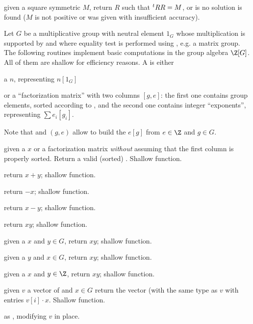  given a square symmetric  $M$, return
$R$ such that $^t{}R\*R = M$, or  is no solution is found ($M$ is
not positive or was given with insufficient accuracy).


Let $G$ be a multiplicative group with neutral element $1_G$ whose
multiplication is supported by  and where equality test is
performed using , e.g. a matrix group. The following
routines implement basic computations in the group algebra $\Z[G]$. All of
them are shallow for efficiency reasons. A  is either

\item a  $n$, representing $n[1_G]$

\item or a ``factorization matrix'' with two columns $[g,e]$: the first one
contains group elements, sorted according to , and the
second one contains integer ``exponents'', representing $\sum e_i [g_i]$.

Note that  and $(g,e)$ allow to build
the  $e[g]$ from $e\in \Z$ and $g\in G$.

 given a  $x$ or a factorization
matrix \emph{without} assuming that the first column is properly sorted.
Return a valid (sorted) . Shallow function.

 return $x+y$; shallow function.

 return $-x$; shallow function.

 return $x-y$; shallow function.

 return $xy$; shallow function.

 given a  $x$ and $y\in G$,
 return $xy$; shallow function.

 given a  $y$ and $x\in G$,
 return $xy$; shallow function.

 given a  $x$ and $y\in \Z$,
 return $xy$; shallow function.

 given $v$ a vector of  and $x\in
G$ return the vector (with the same type as $v$ with entries $v[i]\cdot x$.
Shallow function.

 as , modifying
$v$ in place.


